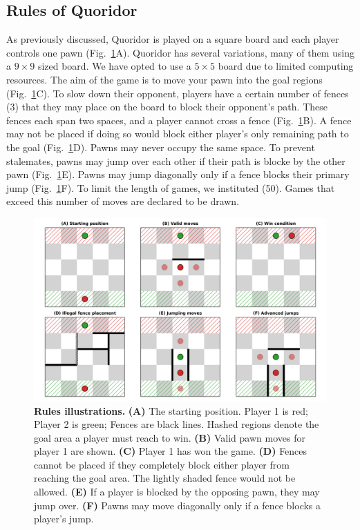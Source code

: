 \documentclass[10pt]{article}
\begin{document}
\subsection{Rules of Quoridor}

As previously discussed, Quoridor is played on a square board and each player controls one pawn (Fig.~\ref{fig:rules}A). Quoridor has several variations,  many of them using a $9 \times 9$ sized board. We have opted to use a $5 \times 5$ board due to limited computing resources. The aim of the game is to move your pawn into the goal regions (Fig.~\ref{fig:rules}C). To slow down their opponent, players have a certain number of fences (3) that they may place on the board to block their opponent's path. These fences each span two spaces, and a player cannot cross a fence (Fig.~\ref{fig:rules}B). A fence may not be placed if doing so would block either player's only remaining path to the goal (Fig.~\ref{fig:rules}D). Pawns may never occupy the same space. To prevent stalemates, pawns may jump over each other if their path is blocke by the other pawn (Fig.~\ref{fig:rules}E). Pawns may jump diagonally only if a fence blocks their primary jump (Fig.~\ref{fig:rules}F). To limit the length of games, we instituted  (50). Games that exceed this number of moves are declared to be drawn.

\begin{figure}[H]
    \centering
    \includegraphics[width=\linewidth]{rules_demo.png}
    \caption{\textbf{Rules illustrations.} \textbf{(A)} The starting position. Player 1 is red; Player 2 is green; Fences are black lines. Hashed regions denote the goal area a player must reach to win. \textbf{(B)} Valid pawn moves for player 1 are shown. \textbf{(C)} Player 1 has won the game. \textbf{(D)} Fences cannot be placed if they completely block either player from reaching the goal area. The lightly shaded fence would not be allowed. \textbf{(E)} If a player is blocked by the opposing pawn, they may jump over. \textbf{(F)} Pawns may move diagonally only if a fence blocks a player's jump.}
    \label{fig:rules}
\end{figure}
\end{document}
